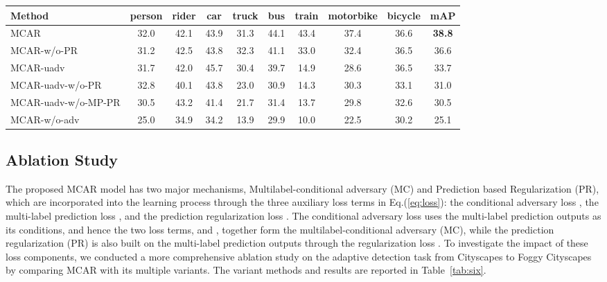 \documentclass[runningheads]{llncs}
\begin{document}
\begin{table*}[t]
\begin{center}
	\caption{The ablation study results in terms of mAP(\%) 
	on the adaptive detection task of Cityscapes  Foggy Cityscapes. 
``w/o-adv" indicates dropping the conditional adversary loss; 
``uadv" indicates replacing the conditional adversary loss with an unconditional adversary loss;
``w/o-PR" indicates dropping the prediction regularization loss;
and 
``w/o-MP-PR" indicates dropping both the multilabel prediction loss and the prediction regularization loss.
}
\label{tab:six}
\renewcommand\arraystretch{1.2}
{
\begin{tabular}{l|cccccccc|c}
\hline
Method   & person & rider & car  & truck & bus  & train & motorbike & bicycle & mAP  \\ \hline
MCAR
& 32.0   & 42.1  & 43.9 & 31.3  & 44.1 & 43.4   & 37.4      & 36.6    & \bf38.8\\\hline
MCAR-w/o-PR
& 31.2   & 42.5  & 43.8 & 32.3  & 41.1 & 33.0   & 32.4      & 36.5    & 36.6\\\hline
MCAR-uadv
& 31.7   & 42.0  & 45.7 & 30.4  & 39.7 & 14.9   & 28.6     & 36.5    & 33.7\\\hline
MCAR-uadv-w/o-PR
& 32.8   & 40.1  & 43.8 & 23.0  & 30.9 & 14.3   & 30.3      & 33.1    & 31.0\\\hline
MCAR-uadv-w/o-MP-PR
& 30.5   & 43.2  & 41.4 & 21.7  & 31.4 & 13.7   & 29.8      & 32.6    & 30.5\\\hline
MCAR-w/o-adv& 25.0   & 34.9  & 34.2 & 13.9  & 29.9 & 10.0   & 22.5      & 30.2    & 25.1\\

\hline

\end{tabular}}
\end{center}
\end{table*}


\subsection{Ablation Study}

The proposed MCAR model has two major mechanisms, Multilabel-conditional adversary (MC) and Prediction based Regularization (PR), which are incorporated into the learning process through 
the three auxiliary loss terms in Eq.(\ref{eq:loss}): 
the conditional adversary loss , 
the multi-label prediction loss , 
and the prediction regularization loss . 
The conditional adversary loss uses the multi-label prediction outputs as its conditions,
and hence the two loss terms,  and ,
together form the multilabel-conditional adversary (MC),
while the prediction regularization (PR) is also built on the multi-label prediction outputs
through the regularization loss . 
To investigate the impact of these loss components, 
we conducted a more comprehensive ablation study 
on the adaptive detection task from Cityscapes to Foggy Cityscapes
by comparing MCAR with its multiple variants. 
The variant methods and results are reported in Table~\ref{tab:six}.
\end{document}
